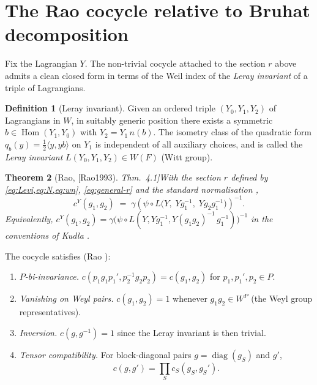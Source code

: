 \documentclass[11pt,letterpaper]{article}
\newcommand{\Hom}{\operatorname{Hom}}
\newcommand{\diag}{\operatorname{diag}}
\newcommand{\F}{F}
\newcommand{\inv}{^{-1}}
\theoremstyle{plain}
\newtheorem{theorem}{Theorem}[section]
\theoremstyle{definition}
\newtheorem{definition}[theorem]{Definition}
\begin{document}
\section{The Rao cocycle relative to Bruhat decomposition}
\label{sec:cocycle}

Fix the Lagrangian $Y$. The non-trivial cocycle attached to the section $r$ above admits a clean closed form in terms of the Weil index of the \emph{Leray invariant} of a triple of Lagrangians.

\begin{definition}[Leray invariant]
Given an ordered triple $(Y_0,Y_1,Y_2)$ of Lagrangians in $W$, in suitably generic position there exists a symmetric $b \in \Hom(Y_1,Y_0)$ with $Y_2 = Y_1\,n(b)$. The isometry class of the quadratic form $q_b(y) = \tfrac{1}{2}\langle y, y b\rangle$ on $Y_1$ is independent of all auxiliary choices, and is called the \emph{Leray invariant} $L(Y_0,Y_1,Y_2) \in W(\F)$ (Witt group).
\end{definition}

\begin{theorem}[Rao, [Rao1993] Thm.~4.1]\label{thm:rao}
With the section $r$ defined by \cref{eq:Levi,eq:N,eq:wn}, \cref{eq:general-r} and the standard normalisation \cite[Thm.~3.5]{Rao1993},
\begin{equation}\label{eq:rao-cocycle}
c^Y(g_1,g_2) \;=\; \gamma\!\left(\psi\circ L\bigl(Y,\;Y g_1\inv,\;Y g_2 g_1\inv\bigr)\right)\inv .
\end{equation}
Equivalently, $c^Y(g_1,g_2) = \gamma\!\bigl(\psi\circ L(Y, Y g_1\inv, Y (g_1 g_2)\inv\,g_1\inv)\bigr)\inv$ in the conventions of Kudla \cite[Thm.~3.1]{Kudla1996}.
\end{theorem}

\noindent
The cocycle satisfies (Rao \cite[\S 4]{Rao1993}):
\begin{enumerate}[leftmargin=2em,itemsep=2pt]
\item \emph{$P$-bi-invariance.} $c(p_1 g_1 p_1', p_2\inv g_2 p_2) = c(g_1,g_2)$ for $p_1,p_1',p_2 \in P$.
\item \emph{Vanishing on Weyl pairs.} $c(g_1,g_2) = 1$ whenever $g_1 g_2 \in W^P$ (the Weyl group representatives).
\item \emph{Inversion.} $c(g, g\inv) = 1$ \cite[Cor.~4.2]{Rao1993} since the Leray invariant is then trivial.
\item \emph{Tensor compatibility.} For block-diagonal pairs $g = \diag(g_S)$ and $g'$,
\[
c(g,g') = \prod_S c_S(g_S, g_S').
\]
\end{enumerate}
\end{document}
